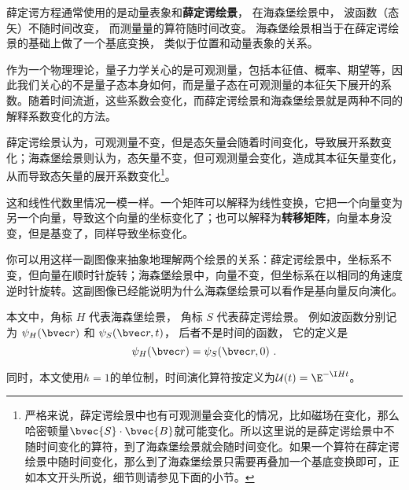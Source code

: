 



薛定谔方程通常使用的是动量表象和\textbf{薛定谔绘景}， 在海森堡绘景中， 波函数（态矢）不随时间改变， 而测量量的算符随时间改变。 海森堡绘景相当于在薛定谔绘景的基础上做了一个基底变换， 类似于位置和动量表象的关系。



作为一个物理理论，量子力学关心的是可观测量，包括本征值、概率、期望等，因此我们关心的不是量子态本身如何，而是量子态在可观测量的本征矢下展开的系数。随着时间流逝，这些系数会变化，而薛定谔绘景和海森堡绘景就是两种不同的解释系数变化的方法。

薛定谔绘景认为，可观测量不变，但是态矢量会随着时间变化，导致展开系数变化；海森堡绘景则认为，态矢量不变，但可观测量会变化，造成其本征矢量变化，从而导致态矢量的展开系数变化\footnote{严格来说，薛定谔绘景中也有可观测量会变化的情况，比如磁场在变化，那么哈密顿量$\bvec{S}\cdot \bvec{B}$就可能变化。所以这里说的是薛定谔绘景中不随时间变化的算符，到了海森堡绘景就会随时间变化。如果一个算符在薛定谔绘景中随时间变化，那么到了海森堡绘景只需要再叠加一个基底变换即可，正如本文开头所说，细节则请参见下面的小节。}。

这和线性代数里情况一模一样。一个矩阵可以解释为线性变换，它把一个向量变为另一个向量，导致这个向量的坐标变化了；也可以解释为\textbf{转移矩阵}，向量本身没变，但是基变了，同样导致坐标变化。

你可以用这样一副图像来抽象地理解两个绘景的关系：薛定谔绘景中，坐标系不变，但向量在顺时针旋转；海森堡绘景中，向量不变，但坐标系在以相同的角速度逆时针旋转。这副图像已经能说明为什么海森堡绘景可以看作是基向量反向演化。

本文中，角标 $H$ 代表海森堡绘景， 角标 $S$ 代表薛定谔绘景。 例如波函数分别记为 $\psi_H(\bvec r)$ 和 $\psi_S(\bvec r, t)$， 后者不是时间的函数， 它的定义是
\begin{equation}
\psi_H(\bvec r) = \psi_S(\bvec r, 0)~.
\end{equation}

同时，本文使用$\hbar=1$的单位制，时间演化算符按定义为$\mathcal{U}(t)=\E^{-\I H t}$。



